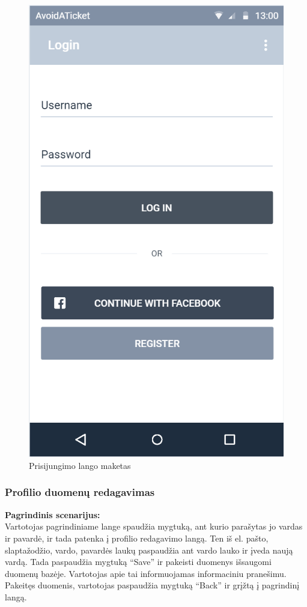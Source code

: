 \documentclass{VUMIFPSkursinis}
\begin{document}
	\begin{figure}[H]
				\centering
				\includegraphics[scale=0.3]{img/mockup_login}
				\caption{Prisijungimo lango maketas}
				\label{img:prisijungimas}
			\end{figure}

\subsubsection{Profilio duomenų redagavimas}
	\textbf{Pagrindinis scenarijus:}\\
	Vartotojas pagrindiniame lange spaudžia mygtuką, ant kurio parašytas jo vardas ir pavardė, ir tada patenka į profilio 
	redagavimo langą. Ten iš el. pašto, slaptažodžio, vardo, pavardės laukų paspaudžia ant vardo lauko ir įveda naują vardą. 
	Tada paspaudžia mygtuką “Save” ir pakeisti duomenys išsaugomi duomenų bazėje. Vartotojas apie tai informuojamas informaciniu pranešimu. 
	Pakeitęs duomenis, vartotojas paspaudžia mygtuką “Back” ir grįžtą į pagrindinį langą.
\end{document}
